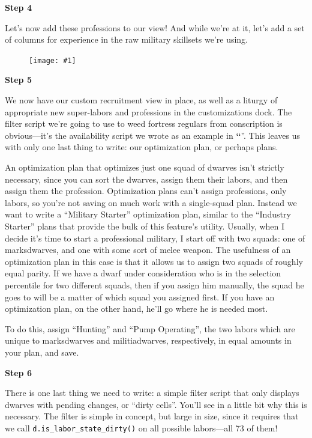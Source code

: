 \documentclass[]{article}
\newcommand{\jump}[1] {\textbf{``\nameref{sec:#1}}''}
\newcommand{\step}[1] {
\vspace{12pt}
\noindent \textbf{Step #1}
}
\newcommand{\fullfigure}[1] {
\begin{figure}[h!]
\texttt{[image: \#1]}
\end{figure}
}
\begin{document}


\step{4}
Let's now add these professions to our view! And while we're at it, let's add a set of columns for
experience in the raw military skillsets we're using.

\fullfigure{Sec5Fig5}

\newpage
\step{5}
We now have our custom recruitment view in place, as well as a liturgy of appropriate new super-labors
and professions in the customizations dock. The filter script we're going to use to weed fortress
regulars from conscription is obvious---it's the availability script we wrote as an example in
\jump{Filter Scripts}. This leaves us with only one last thing to write: our optimization plan, or
perhaps plans.

An optimization plan that optimizes just one squad of dwarves isn't strictly necessary, since you can
sort the dwarves, assign them their labors, and then assign them the profession. Optimization plans can't
assign professions, only labors, so you're not saving on much work with a single-squad plan. Instead we
want to write a ``Military Starter'' optimization plan, similar to the ``Industry Starter'' plans that
provide the bulk of this feature's utility. Usually, when I decide it's time to start a professional
military, I start off with two squads: one of marksdwarves, and one with some sort of melee weapon.
The usefulness of an optimization plan in this case is that it allows us to assign two squads of roughly
equal parity. If we have a dwarf under consideration who is in the selection percentile for two
different squads, then if you assign him manually, the squad he goes to will be a matter of which squad
you assigned first. If you have an optimization plan, on the other hand, he'll go where he is needed
most.

To do this, assign ``Hunting'' and ``Pump Operating'', the two labors which are unique to marksdwarves and militiadwarves, respectively, in equal amounts in your plan, and save.

\step{6}
There is one last thing we need to write: a simple filter script that only displays dwarves with
pending changes, or ``dirty cells''. You'll see in a little bit why this is necessary. The filter is
simple in concept, but large in size, since it requires that we call \texttt{d.is\_labor\_state\_dirty()}
on all possible labors---all 73 of them!
\end{document}
